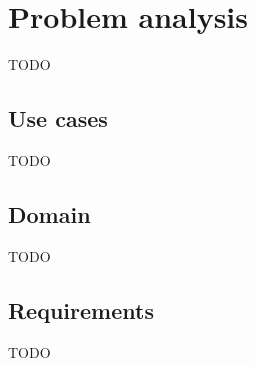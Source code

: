 \section{Problem analysis}
TODO

\subsection{Use cases}
TODO

\subsection{Domain}
TODO

\subsection{Requirements}
TODO